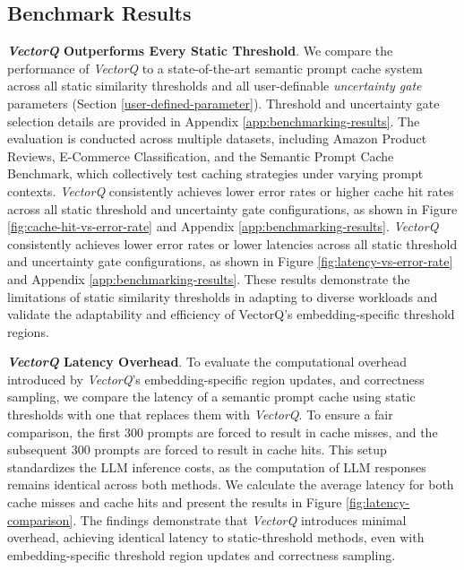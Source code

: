 \subsection{Benchmark Results}

\textbf{\textit{VectorQ} Outperforms Every Static Threshold}. We compare the performance of \textit{VectorQ} to a state-of-the-art semantic prompt cache system across all static similarity thresholds and all user-definable \textit{uncertainty gate} parameters (Section \ref{user-defined-parameter}). Threshold and uncertainty gate selection details are provided in Appendix \ref{app:benchmarking-results}. The evaluation is conducted across multiple datasets, including Amazon Product Reviews, E-Commerce Classification, and the Semantic Prompt Cache Benchmark, which collectively test caching strategies under varying prompt contexts. \textit{VectorQ} consistently achieves lower error rates or higher cache hit rates across all static threshold and uncertainty gate configurations, as shown in Figure \ref{fig:cache-hit-vs-error-rate} and Appendix \ref{app:benchmarking-results}. \textit{VectorQ} consistently achieves lower error rates or lower latencies across all static threshold and uncertainty gate configurations, as shown in Figure \ref{fig:latency-vs-error-rate} and Appendix \ref{app:benchmarking-results}. These results demonstrate the limitations of static similarity thresholds in adapting to diverse workloads and validate the adaptability and efficiency of VectorQ’s embedding-specific threshold regions.

\textbf{\textit{VectorQ} Latency Overhead}. To evaluate the computational overhead introduced by \textit{VectorQ}'s embedding-specific region updates, and correctness sampling, we compare the latency of a semantic prompt cache using static thresholds with one that replaces them with \textit{VectorQ}. To ensure a fair comparison, the first 300 prompts are forced to result in cache misses, and the subsequent 300 prompts are forced to result in cache hits. This setup standardizes the LLM inference costs, as the computation of LLM responses remains identical across both methods. We calculate the average latency for both cache misses and cache hits and present the results in Figure \ref{fig:latency-comparison}. The findings demonstrate that \textit{VectorQ} introduces minimal overhead, achieving identical latency to static-threshold methods, even with embedding-specific threshold region updates and correctness sampling.

